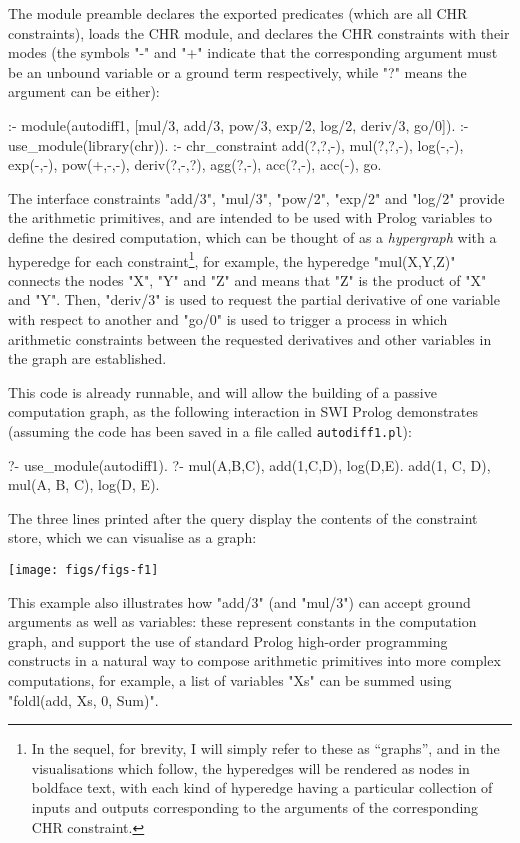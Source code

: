 The module preamble declares the exported predicates (which are all CHR constraints),
loads the CHR module, and declares the CHR constraints with their modes (the symbols "-"
and "+" indicate that the corresponding argument must be an unbound variable or a
ground term respectively, while "?" means the argument can be either):
\begin{prolog-framed}[name=adone]
	:- module(autodiff1, [mul/3, add/3, pow/3, exp/2, log/2, deriv/3, go/0]).
	:- use_module(library(chr)).
	:- chr_constraint add(?,?,-), mul(?,?,-), log(-,-), exp(-,-), pow(+,-,-),
										deriv(?,-,?), agg(?,-), acc(?,-), acc(-), go.
\end{prolog-framed}
The interface constraints "add/3", "mul/3", "pow/2", "exp/2" and "log/2" provide
the arithmetic primitives, and are intended to be used with Prolog variables to
define the desired computation, which can be thought of as a \emph{hypergraph} with
a hyperedge for each constraint\footnote{%
In the sequel, for brevity, I will simply refer to these as ``graphs'', and in
the visualisations which follow, the hyperedges will be rendered as nodes in boldface text, 
with each kind of hyperedge having a particular collection of inputs and outputs
corresponding to the arguments of the corresponding CHR constraint.},
for example, the hyperedge "mul(X,Y,Z)" connects
the nodes "X", "Y" and "Z" and means that "Z" is the product of "X" and "Y".
Then, "deriv/3" is used to request the partial
derivative of one variable with respect to another and "go/0" is used to trigger
a process in which arithmetic constraints between the requested derivatives and
other variables in the graph are established.

This code is already runnable, and will allow the building of a passive computation
graph, as the following interaction in SWI Prolog demonstrates (assuming the code has 
been saved in a file called \texttt{autodiff1.pl}):
\begin{prolog-barred}
	?- use_module(autodiff1).
	?- mul(A,B,C), add(1,C,D), log(D,E).
	add(1, C, D),
	mul(A, B, C),
	log(D, E).
\end{prolog-barred}
The three lines printed after the query display the contents of the constraint store,
which we can visualise as a graph:
\begin{center}
\texttt{[image: figs/figs-f1]}
\end{center}
This example also illustrates how "add/3" (and "mul/3") can accept ground arguments as well
as variables: these represent constants in the computation graph, and support the use of
standard Prolog high-order programming constructs in a natural way to compose arithmetic primitives
into more complex computations, for example, a list of variables "Xs" can be summed using
"foldl(add, Xs, 0, Sum)".

